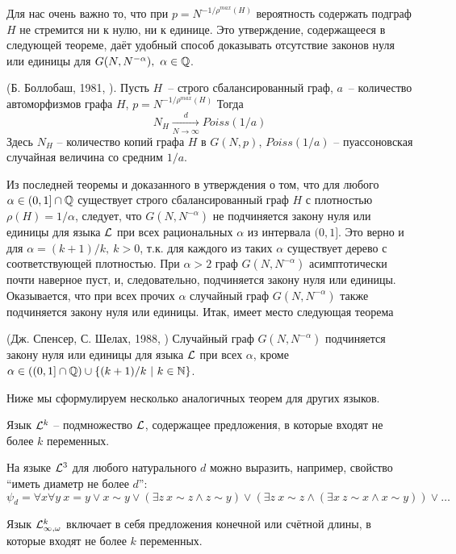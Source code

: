 Для нас очень важно то, что при $p = N^{-1/\rho^{max}(H)}$ вероятность содержать подграф $H$ не стремится ни к нулю, ни к единице.
Это утверждение, содержащееся в следующей теореме, даёт удобный способ доказывать отсутствие законов нуля или единицы для $G(N, N^{-\alpha}), ~\alpha \in \mathbb {Q}$.

\begin{theorem} (Б. Боллобаш, 1981, \cite{bollobas1981threshold}). Пусть $H$~-- строго сбалансированный граф, $a$~-- количество автоморфизмов графа $H$, $p = N^{-1/ \rho^{max}(H)}$
Тогда
\[N_H \xrightarrow[N\rightarrow \infty]{d} Poiss(1/a) \]
Здесь $N_H$ -- количество копий графа $H$ в $G(N, p)$, $Poiss(1/a)$ -- пуассоновская случайная величина со средним $1/a$.
\end{theorem}
Из последней теоремы и доказанного в \cite{rucinski1986strongly} утверждения о том, что для любого $\alpha \in (0,1] \cap \mathbb {Q}$ существует строго сбалансированный граф $H$ с плотностью $\rho(H) = 1/\alpha$, следует, что $G(N,N^{-\alpha})$ не подчиняется закону нуля или единицы для языка $\mathcal{L}$ при всех рациональных $\alpha$ из интервала $(0,1]$.
Это верно и для $\alpha = (k+1)/k,~ k > 0$, т.к. для каждого из таких $\alpha$ существует дерево с соответствующей плотностью.
При $\alpha > 2$ граф $G(N, N^{-\alpha})$ асимптотически почти наверное пуст, и, следовательно, подчиняется закону нуля или единицы.
Оказывается, что при всех прочих $\alpha$ случайный граф $G(N, N^{-\alpha})$ также подчиняется закону нуля или единицы.
Итак, имеет место следующая теорема
\begin{theorem} (Дж. Спенсер, С. Шелах, 1988, \cite{shelah1988zero})
Случайный граф $G(N, N^{-\alpha})$ подчиняется закону нуля или единицы для языка $\mathcal{L}$ при всех $\alpha$, кроме $\alpha \in \left((0,1] \cap \mathbb {Q} \right) \cup \{(k+1)/k ~|~ k \in \mathbb {N} \}$.
\end{theorem}

Ниже мы сформулируем несколько аналогичных теорем для других языков.

\Def Язык $\mathcal{L}^k$ -- подмножество $\mathcal{L}$, содержащее предложения, в которые входят не более $k$ переменных.

На языке $\mathcal{L}^3$ для любого натурального $d$ можно выразить, например, свойство ``иметь диаметр не более $d$'': 
\[
\psi_d = \forall x \forall y ~ x = y \vee x \sim y \vee \left( \exists z ~ x\sim z \wedge z \sim y \right)
\vee  \left( \exists z ~ x\sim z \wedge \left( \exists x ~ z \sim x \wedge x \sim y \right) \right) \vee \ldots
\]

\Def Язык $\mathcal{L}^k_{\infty, \omega}$ включает в себя предложения конечной или счётной длины, в которые входят не более $k$ переменных.

